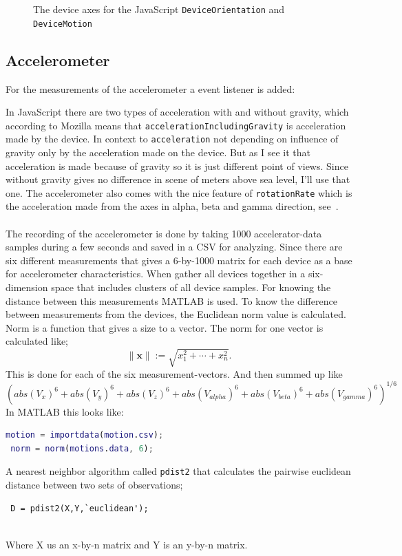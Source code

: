 \begin{figure}[H]
\begin{minipage}[c]{.23\textwidth}
    \hspace{1cm}
  \end{minipage}
  \caption{The device axes for the JavaScript \texttt{DeviceOrientation} and \texttt{DeviceMotion}}
  \label{fig:device-axes}
\end{figure}

\subsection{Accelerometer}
For the measurements of the accelerometer a event listener is added:

In JavaScript there are two types of acceleration with and without gravity, which according to Mozilla means that \texttt{accelerationIncludingGravity} is acceleration made by the device. In context to \texttt{acceleration} not depending on influence of gravity only by the acceleration made on the device. But as I see it that acceleration is made because of gravity so it is just different point of views. Since without gravity gives no difference in scene of meters above sea level, I'll use that one. The accelerometer also comes with the nice feature of \texttt{rotationRate} which is the acceleration made from the axes in alpha, beta and gamma direction, see~. \cite[]{sensor:accIncludingGravity}\\
\\
The recording of the accelerometer is done by taking 1000 accelerator-data samples during a few seconds and saved in a CSV for analyzing. Since there are six different measurements that gives a 6-by-1000 matrix for each device as a base for accelerometer characteristics. When gather all devices together in a six-dimension space that includes clusters of all device samples. For knowing the distance between this measurements MATLAB is used. To know the difference between measurements from the devices, the Euclidean norm value is calculated. Norm is a function that gives a size to a vector.  The norm for one vector is calculated like;
$$\|\boldsymbol{x}\| := \sqrt{x_1^2 + \cdots + x_n^2}.$$
This is done for each of the six measurement-vectors. And then summed up like
$$(abs(V_x)^6 + abs(V_y)^6 + abs(V_z)^6 + abs(V_{alpha})^6 + abs(V_{beta})^6 + abs(V_{gamma})^6)^{1/6}$$
In MATLAB this looks like:
\begin{lstlisting}[language=Matlab]
 motion = importdata(motion.csv);
 norm = norm(motions.data, 6);
\end{lstlisting}
A nearest neighbor algorithm called \texttt{pdist2} that calculates the pairwise euclidean distance between two sets of observations;
\begin{lstlisting} 
 D = pdist2(X,Y,`euclidean'); 
 
\end{lstlisting}
Where X us an x-by-n matrix and Y is an y-by-n matrix. 


